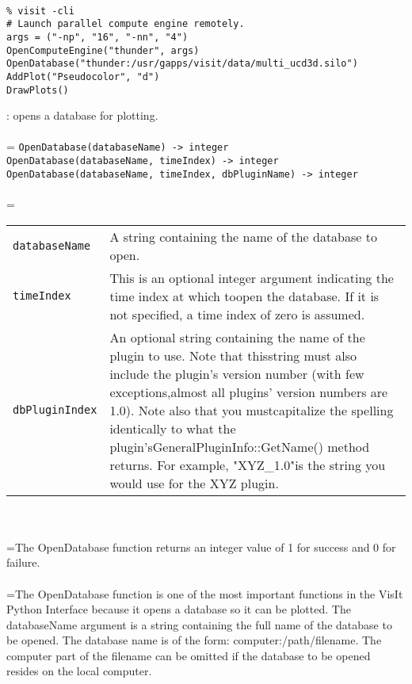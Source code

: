 \documentclass[10pt,a4paper]{report}
\begin{document}
\\[-6mm]
\begin{verbatim}% visit -cli
# Launch parallel compute engine remotely.
args = ("-np", "16", "-nn", "4")
OpenComputeEngine("thunder", args)
OpenDatabase("thunder:/usr/gapps/visit/data/multi_ucd3d.silo")
AddPlot("Pseudocolor", "d")
DrawPlots()
\end{verbatim}
\newpage


{}
: opens a database for plotting.\\[-3mm]

 \\ 
\hangindent=\parindent 
\verb!OpenDatabase(databaseName) -> integer!\\ 
\verb!OpenDatabase(databaseName, timeIndex) -> integer!\\ 
\verb!OpenDatabase(databaseName, timeIndex, dbPluginName) -> integer!\\ [-3mm]

 \\ 
\hangindent=\parindent 
\begin{tabular}{lp{9cm}}
\verb!databaseName! & A string containing the name of the database to open. \\
\verb!timeIndex! & This is an optional integer argument indicating the time index at which toopen the database. If it is not specified, a time index of zero is assumed. \\
\verb!dbPluginIndex! & An optional string containing the name of the plugin to use. Note that thisstring must also include the plugin's version number (with few exceptions,almost all plugins' version numbers are 1.0). Note also that you mustcapitalize the spelling identically to what the plugin'sGeneralPluginInfo::GetName() method returns. For example, "XYZ\_1.0"is the string you would use for the XYZ plugin. \\
\end{tabular} \\[-2mm]


 \\ 
\hangindent=\parindent The OpenDatabase function returns an integer value of 1 for success and 0 for failure. \\[-3mm] 

 \\ 
\hangindent=\parindent The OpenDatabase function is one of the most important functions in the VisIt Python Interface because it opens a database so it can be plotted. The databaseName argument is a string containing the full name of the database to be opened. The database name is of the form: computer:/path/filename. The computer part of the filename can be omitted if the database to be opened resides on the local computer. \\[-3mm] 
\end{document}
